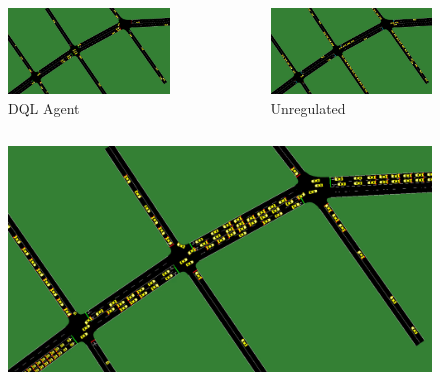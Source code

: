 \documentclass[dvipsnames]{beamer}
\begin{document}
\begin{frame}
  \begin{columns}
    \begin{column}{0.5\textwidth}
      \begin{figure}
        \centering
        \includegraphics[width=1.0\textwidth]{figures/demo.dql-d-dwt.png}
        \caption{DQL Agent}
      \end{figure}
    \end{column}
    \begin{column}{0.5\textwidth}
      \begin{figure}
        \centering
        \includegraphics[width=1.0\textwidth]{figures/demo.priority.png}
        \caption{Unregulated}
      \end{figure}
    \end{column}
  \end{columns}
  \begin{columns}
    \begin{column}{0.5\textwidth}
      \begin{figure}
        \centering
        \includegraphics[width=1.00\textwidth]{figures/demo.fixed15.png}

\end{figure}
\end{column}
\end{columns}
\end{frame}
\end{document}
